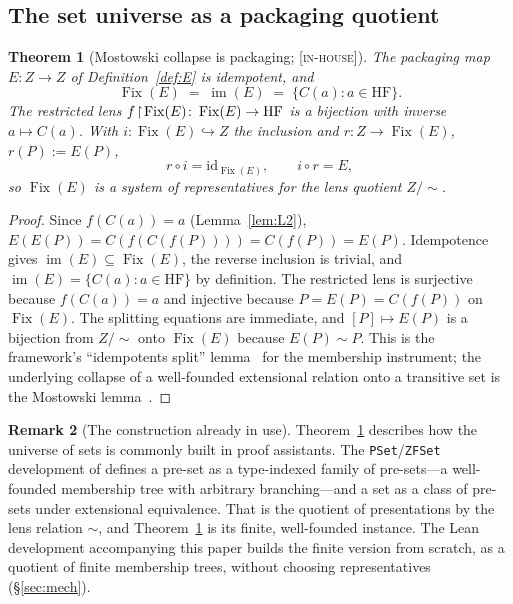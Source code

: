 \documentclass[11pt]{article}
\newcommand{\HF}{\mathrm{HF}}                 \newcommand{\rank}{\operatorname{rank}}
\newcommand{\Fix}{\operatorname{Fix}}
\newcommand{\im}{\operatorname{im}}
\newcommand{\gradetag}[1]{\textnormal{\textsc{[#1]}}}
\newcommand{\inhouse}{\gradetag{in-house}}
\newtheorem{theorem}{Theorem}[section]
\theoremstyle{definition}
\newtheorem{remark}[theorem]{Remark}
\begin{document}
\subsection{The set universe as a packaging quotient}\label{ssec:p5}

\begin{theorem}[Mostowski collapse is packaging; \inhouse]\label{thm:p5}
The packaging map $E\colon Z\to Z$ of Definition~\ref{def:E} is idempotent, and
\[
  \Fix(E)\;=\;\im(E)\;=\;\{C(a): a\in\HF\}.
\]
The restricted lens $f\restr\Fix(E)\colon \Fix(E)\to\HF$ is a bijection with inverse $a\mapsto
C(a)$. With $i\colon\Fix(E)\hookrightarrow Z$ the inclusion and $r\colon Z\to\Fix(E)$,
$r(P):=E(P)$,
\[
  r\circ i=\mathrm{id}_{\Fix(E)},\qquad i\circ r=E,
\]
so $\Fix(E)$ is a system of representatives for the lens quotient $Z/{\sim}$.
\end{theorem}

\begin{proof}
Since $f(C(a))=a$ (Lemma~\ref{lem:L2}), $E(E(P))=C(f(C(f(P))))=C(f(P))=E(P)$. Idempotence gives
$\im(E)\subseteq\Fix(E)$, the reverse inclusion is trivial, and $\im(E)=\{C(a):a\in\HF\}$ by
definition. The restricted lens is surjective because $f(C(a))=a$ and injective because $P=E(P)=
C(f(P))$ on $\Fix(E)$. The splitting equations are immediate, and $[P]\mapsto E(P)$ is a
bijection from $Z/{\sim}$ onto $\Fix(E)$ because $E(P)\sim P$. This is the framework's
``idempotents split'' lemma~\citep{SBTFoundationsI} for the membership instrument; the
underlying collapse of a well-founded extensional relation onto a transitive set is the Mostowski
lemma~\citep{Mostowski1949}.
\end{proof}

\begin{remark}[The construction already in use]\label{rem:mathlib}
Theorem~\ref{thm:p5} describes how the universe of sets is commonly built in proof assistants.
The \texttt{PSet}/\texttt{ZFSet} development of \citet{Mathlib2020} defines a pre-set as a
type-indexed family of pre-sets---a well-founded membership tree with arbitrary branching---and a
set as a class of pre-sets under extensional equivalence. That is the quotient of presentations
by the lens relation $\sim$, and Theorem~\ref{thm:p5} is its finite, well-founded instance. The
Lean development accompanying this paper builds the finite version from scratch, as a quotient of
finite membership trees, without choosing representatives (\S\ref{sec:mech}).
\end{remark}
\end{document}

